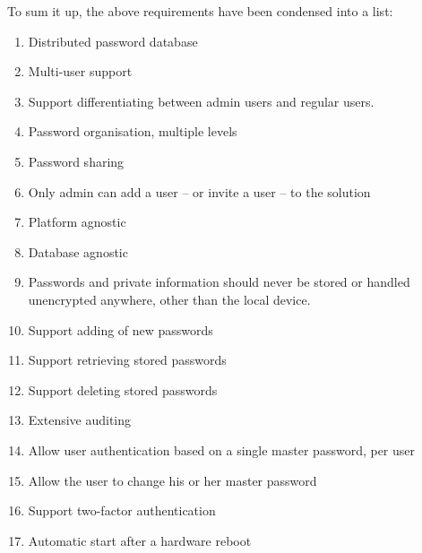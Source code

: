 			To sum it up, the above requirements have been condensed into a list:
			\vspace{-3ex}\begin{enumerate}
				\setlength\itemsep{0.1em}
				\item Distributed password database \label{requirement:distrib_password}
				\item Multi-user support \label{requirement:multi_user}
				\item Support differentiating between admin users and regular users. \label{requirement:admin_user}
				\item Password organisation, multiple levels \label{requirement:organization}
				\item Password sharing \label{requirement:sharing}
				\item Only admin can add a user -- or invite a user -- to the solution \label{requirement:add}
				\item Platform agnostic \label{requirement:platform}
				\item Database agnostic \label{requirement:database}
				\item Passwords and private information should never be stored or handled unencrypted anywhere, other than the local device. \label{requirement:passwords_local}
				\item Support adding of new passwords \label{requirement:new}
				\item Support retrieving stored passwords \label{requirement:retrieve}
				\item Support deleting stored passwords \label{requirement:delete}
				\item Extensive auditing \label{requirement:audit}
				\item Allow user authentication based on a single master password, per user \label{requirement:auth}
				\item Allow the user to change his or her master password \label{requirement:change}
				\item Support two-factor authentication \label{requirement:two-factor}
				\item Automatic start after a hardware reboot \label{requirement:restart}
			\end{enumerate}


